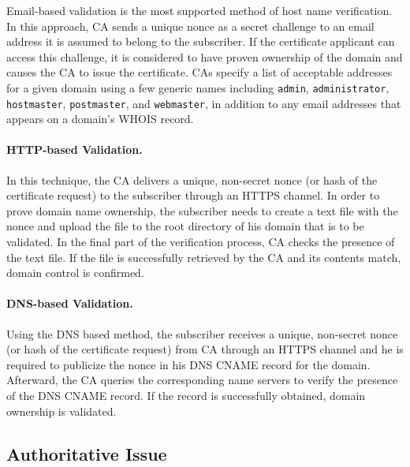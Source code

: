 Email-based validation is the most supported method of host name verification. In this approach, CA sends a unique nonce as a secret challenge to an email address it is assumed to belong to the subscriber. If the certificate applicant can access this challenge, it is considered to have proven ownership of the domain and causes the CA to issue the certificate. CAs specify a list of acceptable addresses for a given domain using a few generic names including \texttt{admin}, \texttt{administrator}, \texttt{hostmaster}, \texttt{postmaster}, and \texttt{webmaster}, in addition to any email addresses that appears on a domain's WHOIS record. 

\paragraph{HTTP-based Validation.}

In this technique, the CA delivers a unique, non-secret nonce (or hash of the certificate request) to the subscriber through an HTTPS channel. In order to prove domain name ownership, the subscriber needs to create a text file with the nonce and upload the file to the root directory of his domain that is to be validated. In the final part of the verification process, CA checks the presence of the text file. If the file is successfully retrieved by the CA and its contents match, domain control is confirmed.

\paragraph{DNS-based Validation.}

Using the DNS based method, the subscriber receives a unique, non-secret nonce (or hash of the certificate request) from CA through an HTTPS channel and he is required to publicize the nonce in his DNS CNAME record for the domain. Afterward, the CA queries the corresponding name servers to verify the presence of the DNS CNAME record. If the record is successfully obtained, domain ownership is validated.


\subsection{Authoritative Issue}

